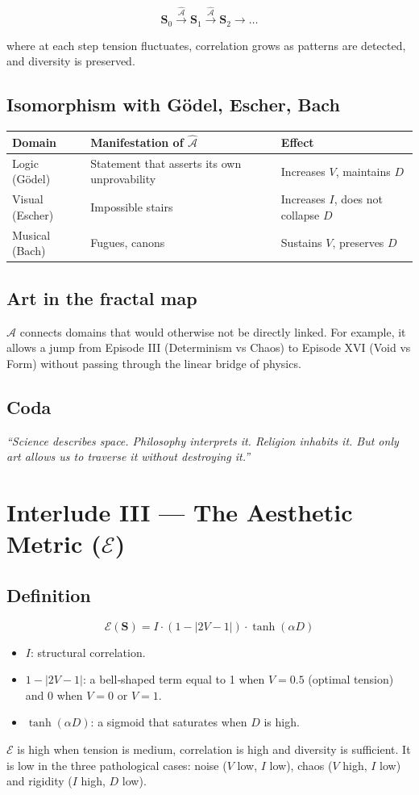 \documentclass[12pt,oneside]{report}
\begin{document}
\[
\mathbf{S}_0 \xrightarrow{\hat{\mathcal{A}}} \mathbf{S}_1 \xrightarrow{\hat{\mathcal{A}}} \mathbf{S}_2 \to \dots
\]

where at each step tension fluctuates, correlation grows as patterns are detected, and diversity is preserved.

\section{Isomorphism with Gödel, Escher, Bach}
\begin{tabular}{lll}
\toprule
Domain & Manifestation of \(\hat{\mathcal{A}}\) & Effect \\
\midrule
Logic (Gödel) & Statement that asserts its own unprovability & Increases \(V\), maintains \(D\) \\
Visual (Escher) & Impossible stairs & Increases \(I\), does not collapse \(D\) \\
Musical (Bach) & Fugues, canons & Sustains \(V\), preserves \(D\) \\
\bottomrule
\end{tabular}

\section{Art in the fractal map}
\(\hat{\mathcal{A}}\) connects domains that would otherwise not be directly linked. For example, it allows a jump from Episode III (Determinism vs Chaos) to Episode XVI (Void vs Form) without passing through the linear bridge of physics.

\section{Coda}
\emph{“Science describes space. Philosophy interprets it. Religion inhabits it. But only art allows us to traverse it without destroying it.”}

\chapter{Interlude III — The Aesthetic Metric (\(\mathcal{E}\))}

\section{Definition}
\[
\mathcal{E}(\mathbf{S}) = I \cdot (1 - |2V - 1|) \cdot \tanh(\alpha D)
\]
\begin{itemize}
\item \(I\): structural correlation.
\item \(1 - |2V - 1|\): a bell‑shaped term equal to 1 when \(V = 0.5\) (optimal tension) and 0 when \(V = 0\) or \(V = 1\).
\item \(\tanh(\alpha D)\): a sigmoid that saturates when \(D\) is high.
\end{itemize}
\(\mathcal{E}\) is high when tension is medium, correlation is high and diversity is sufficient. It is low in the three pathological cases: noise (\(V\) low, \(I\) low), chaos (\(V\) high, \(I\) low) and rigidity (\(I\) high, \(D\) low).
\end{document}
